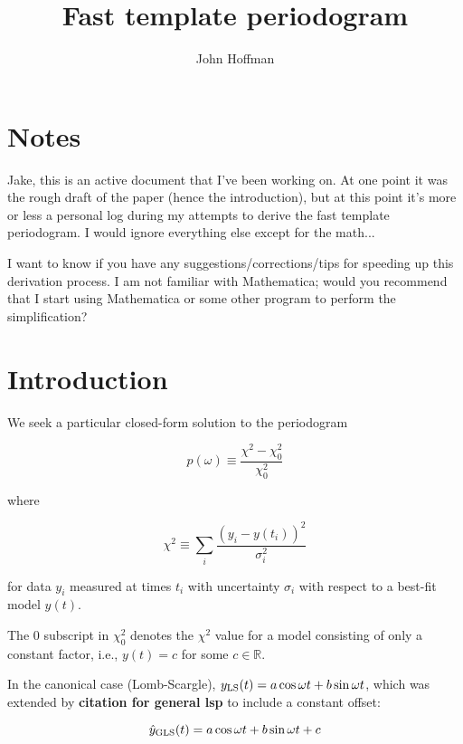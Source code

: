 \documentclass[notitlepage]{article}
\title{Fast template periodogram}
\author{John Hoffman}
\newcommand{\todo}[1]{{\bf #1}}
\begin{document}
\maketitle

\section{Notes}

Jake, this is an active document that I've been working on. At one point it was the rough draft
of the paper (hence the introduction), but at this point it's more or less a personal log 
during my attempts to derive the fast 
template periodogram. I would ignore everything else except for the math...

I want to know if you have any suggestions/corrections/tips for speeding up this derivation 
process. I am not familiar with Mathematica; would you recommend that I start using
Mathematica or some other program to perform the simplification?

\section{Introduction}

We seek a particular closed-form solution to the periodogram 

\begin{equation}
p(\omega)\equiv \frac{\chi^2 - \chi^2_0}{\chi^2_0}
\end{equation}

where

\begin{equation}
\chi^2 \equiv \sum_i \frac{\left(y_i - y(t_i)\right)^2}{\sigma_i^2}
\end{equation}

for data $y_i$ measured at times $t_i$ with uncertainty $\sigma_i$ with 
respect to a best-fit model $y(t)$. 

The $0$ subscript in $\chi^2_0$ denotes the $\chi^2$ value for a
 model consisting of only a constant factor, i.e., $y(t) = c$ for some $c\in\mathbb{R}$. 

In the canonical case (Lomb-Scargle), $y_{\rm LS}(t) = a \cos\omega t + b\sin\omega t$, which was extended by
\todo{citation for general lsp} to include a constant offset:

\begin{equation}
\hat{y}_{\rm GLS}(t) = a\cos\omega t + b\sin\omega t + c
\end{equation}
\end{document}
